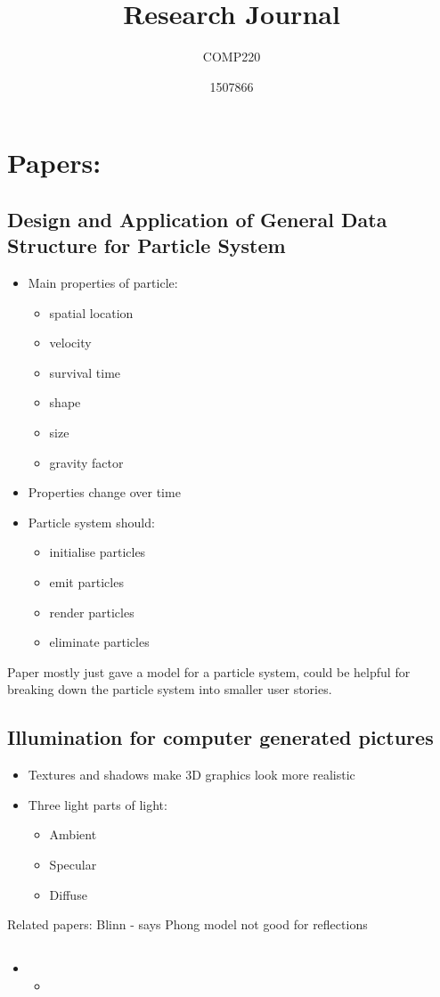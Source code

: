 \documentclass{scrartcl}
\title{Research Journal}
\subtitle{COMP220}
\author{1507866}
\begin{document}
	
\maketitle

	
\section{Papers:}
\subsection{Design and Application of General Data Structure for Particle System \cite{Huang}}
\begin{itemize}
	\item Main properties of particle:
	\begin{itemize}
		\item spatial location
		\item velocity
		\item survival  time
		\item shape
		\item size
		\item gravity factor 
	\end{itemize}
	\item Properties change over time 
	\item Particle system should:
		\begin{itemize}
			\item initialise particles
			\item emit particles
			\item render particles
			\item eliminate particles 
		\end{itemize}
\end{itemize}

Paper mostly just gave a model for a particle system, could be helpful for breaking down the particle system into smaller user stories.


\subsection{Illumination for computer generated pictures \cite{Phong}}
\begin{itemize}
	\item Textures and shadows make 3D graphics look more realistic
	\item Three light parts of light:
	\begin{itemize}
		\item Ambient
		\item Specular
		\item Diffuse
	\end{itemize}
\end{itemize}
Related papers: Blinn \cite{Blinn} - says Phong model not good for reflections

\subsection{ \cite{}}
\begin{itemize}
	\item 
	\begin{itemize}
		\item 
	\end{itemize}
\end{itemize}
	


	
\end{document}
